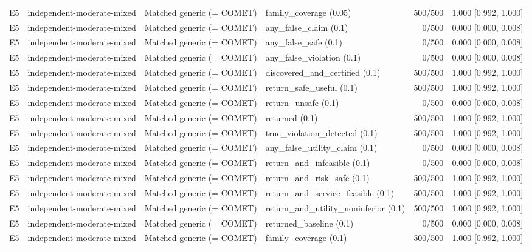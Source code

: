 \begin{longtable}{p{.04\linewidth}p{.18\linewidth}p{.19\linewidth}p{.16\linewidth}r p{.21\linewidth}}
E5 & independent-moderate-mixed & Matched generic (= COMET) & family\_coverage (0.05) & 500/500 & 1.000 [0.992, 1.000]\\
E5 & independent-moderate-mixed & Matched generic (= COMET) & any\_false\_claim (0.1) & 0/500 & 0.000 [0.000, 0.008]\\
E5 & independent-moderate-mixed & Matched generic (= COMET) & any\_false\_safe (0.1) & 0/500 & 0.000 [0.000, 0.008]\\
E5 & independent-moderate-mixed & Matched generic (= COMET) & any\_false\_violation (0.1) & 0/500 & 0.000 [0.000, 0.008]\\
E5 & independent-moderate-mixed & Matched generic (= COMET) & discovered\_and\_certified (0.1) & 500/500 & 1.000 [0.992, 1.000]\\
E5 & independent-moderate-mixed & Matched generic (= COMET) & return\_safe\_useful (0.1) & 500/500 & 1.000 [0.992, 1.000]\\
E5 & independent-moderate-mixed & Matched generic (= COMET) & return\_unsafe (0.1) & 0/500 & 0.000 [0.000, 0.008]\\
E5 & independent-moderate-mixed & Matched generic (= COMET) & returned (0.1) & 500/500 & 1.000 [0.992, 1.000]\\
E5 & independent-moderate-mixed & Matched generic (= COMET) & true\_violation\_detected (0.1) & 500/500 & 1.000 [0.992, 1.000]\\
E5 & independent-moderate-mixed & Matched generic (= COMET) & any\_false\_utility\_claim (0.1) & 0/500 & 0.000 [0.000, 0.008]\\
E5 & independent-moderate-mixed & Matched generic (= COMET) & return\_and\_infeasible (0.1) & 0/500 & 0.000 [0.000, 0.008]\\
E5 & independent-moderate-mixed & Matched generic (= COMET) & return\_and\_risk\_safe (0.1) & 500/500 & 1.000 [0.992, 1.000]\\
E5 & independent-moderate-mixed & Matched generic (= COMET) & return\_and\_service\_feasible (0.1) & 500/500 & 1.000 [0.992, 1.000]\\
E5 & independent-moderate-mixed & Matched generic (= COMET) & return\_and\_utility\_noninferior (0.1) & 500/500 & 1.000 [0.992, 1.000]\\
E5 & independent-moderate-mixed & Matched generic (= COMET) & returned\_baseline (0.1) & 0/500 & 0.000 [0.000, 0.008]\\
E5 & independent-moderate-mixed & Matched generic (= COMET) & family\_coverage (0.1) & 500/500 & 1.000 [0.992, 1.000]\\

\end{longtable}
